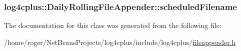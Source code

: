 \hypertarget{classlog4cplus_1_1DailyRollingFileAppender_ad29319815bc3795962df15aa7aebe1a0}{
\subsubsection[{scheduled\-Filename}]{ log4cplus\-::\-Daily\-Rolling\-File\-Appender\-::scheduled\-Filename\hspace{0.3cm}{\ttfamily [protected]}}}\label{classlog4cplus_1_1DailyRollingFileAppender_ad29319815bc3795962df15aa7aebe1a0}


The documentation for this class was generated from the following file\-:\begin{DoxyCompactItemize}
\item 
/home/roger/\-Net\-Beans\-Projects/log4cplus/include/log4cplus/\hyperlink{fileappender_8h}{fileappender.\-h}\end{DoxyCompactItemize}
